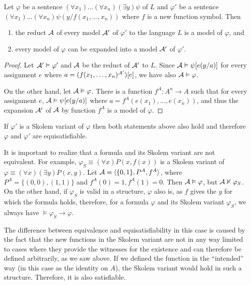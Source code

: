 \begin{lemma}
Let $\varphi$ be a sentence $(\forall x_1)\dots(\forall x_n)(\exists y)\psi$ of $L$ and $\varphi'$ be a sentence $(\forall x_1)\dots(\forall x_n)\psi(y/f(x_1, \dots, x_n))$ where $f$ is a new function symbol. Then
\begin{enumerate}
	\item the reduct $\mathcal{A}$ of every model $\mathcal{A}'$ of $\varphi'$ to the language $L$ is a model of $\varphi$, and
	\item every model of $\varphi$ can be expanded into a model $\mathcal{A}'$ of $\varphi'$.
\end{enumerate}
\end{lemma}
\begin{proof}
Let $\mathcal{A}' \vDash \varphi'$ and $\mathcal{A}$ be the reduct of $\mathcal{A}'$ to $L$. Since $\mathcal{A} \vDash \psi[e(y/a)]$ for every assignment $e$ where $a = (f(x_1, \dots, x_n)^{\mathcal{A}'})[e]$, we have also $\mathcal{A} \vDash \varphi$.

On the other hand, let $\mathcal{A} \vDash \varphi$. There is a function $f^A: A^n \to A$ such that for every assignment $e$, $\mathcal{A} \vDash \psi[e(y/a)]$ where $a = f^A(e(x_1), \dots, e(x_n))$, and thus the expansion $\mathcal{A}'$ of $\mathcal{A}$ by function $f^A$ is a model of $\varphi$.
\end{proof}

If $\varphi'$ is a Skolem variant of $\varphi$ then both statements above also hold and therefore $\varphi$ and $\varphi'$ are equisatisfiable.

It is important to realize that a formula and its Skolem variant are not equivalent. For example, $\varphi_S \equiv (\forall x)P(x,f(x))$ is a Skolem variant of $\varphi \equiv (\forall x)(\exists y)P(x,y)$. Let $\mathcal{A} =\langle \{0,1\}, P^A, f^A \rangle$, where $P^A = \{(0,0), (1,1)\}$ and $f^A(0)=1, f^A(1)=0$. Then $\mathcal{A} \vDash \varphi$, but $\mathcal{A} \nvDash \varphi_S$. On the other hand, if $\varphi_S$ is valid in a structure, $\varphi$ also is, as $f$ gives the $y$ for which the formula holds, therefore, for a formula $\varphi$ and its Skolem variant $\varphi_S$, we always have $\vDash \varphi_S \to \varphi$. 

The difference between equivalence and equisatisfiability in this case is caused by the fact that the new functions in the Skolem variant are not in any way limited to cases where they provide the witnesses for the existence and can therefore be defined arbitrarily, as we saw above. If we defined the function in the ``intended'' way (in this case as the identity on $A$), the Skolem variant would hold in such a structure. Therefore, it is also satisfiable.

